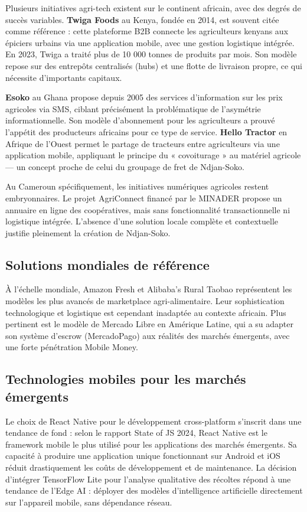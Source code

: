\documentclass[12pt,a4paper]{report}
\begin{document}
Plusieurs initiatives agri-tech existent sur le continent africain, avec des degrés de succès variables. \textbf{Twiga Foods} au Kenya, fondée en 2014, est souvent citée comme référence : cette plateforme B2B connecte les agriculteurs kenyans aux épiciers urbains via une application mobile, avec une gestion logistique intégrée. En 2023, Twiga a traité plus de 10 000 tonnes de produits par mois. Son modèle repose sur des entrepôts centralisés (hubs) et une flotte de livraison propre, ce qui nécessite d'importants capitaux.

\textbf{Esoko} au Ghana propose depuis 2005 des services d'information sur les prix agricoles via SMS, ciblant précisément la problématique de l'asymétrie informationnelle. Son modèle d'abonnement pour les agriculteurs a prouvé l'appétit des producteurs africains pour ce type de service. \textbf{Hello Tractor} en Afrique de l'Ouest permet le partage de tracteurs entre agriculteurs via une application mobile, appliquant le principe du « covoiturage » au matériel agricole — un concept proche de celui du groupage de fret de Ndjan-Soko.

Au Cameroun spécifiquement, les initiatives numériques agricoles restent embryonnaires. Le projet AgriConnect financé par le MINADER propose un annuaire en ligne des coopératives, mais sans fonctionnalité transactionnelle ni logistique intégrée. L'absence d'une solution locale complète et contextuelle justifie pleinement la création de Ndjan-Soko.

\subsection{Solutions mondiales de référence}

À l'échelle mondiale, Amazon Fresh et Alibaba's Rural Taobao représentent les modèles les plus avancés de marketplace agri-alimentaire. Leur sophistication technologique et logistique est cependant inadaptée au contexte africain. Plus pertinent est le modèle de Mercado Libre en Amérique Latine, qui a su adapter son système d'escrow (MercadoPago) aux réalités des marchés émergents, avec une forte pénétration Mobile Money.

\subsection{Technologies mobiles pour les marchés émergents}

Le choix de React Native pour le développement cross-platform s'inscrit dans une tendance de fond : selon le rapport State of JS 2024, React Native est le framework mobile le plus utilisé pour les applications des marchés émergents. Sa capacité à produire une application unique fonctionnant sur Android et iOS réduit drastiquement les coûts de développement et de maintenance. La décision d'intégrer TensorFlow Lite pour l'analyse qualitative des récoltes répond à une tendance de l'Edge AI : déployer des modèles d'intelligence artificielle directement sur l'appareil mobile, sans dépendance réseau.
\end{document}
